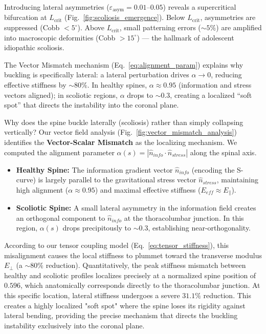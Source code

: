 \documentclass[11pt]{article}
\begin{document}
Introducing lateral asymmetries ($\varepsilon_{\mathrm{asym}} = 0.01$--$0.05$) reveals a supercritical bifurcation at $L_{\mathrm{crit}}$ (Fig.~\ref{fig:scoliosis_emergence}). Below $L_{\mathrm{crit}}$, asymmetries are suppressed (Cobb $< 5^\circ$). Above $L_{\mathrm{crit}}$, small patterning errors (${\sim}5\%$) are amplified into macroscopic deformities (Cobb $> 15^\circ$) --- the hallmark of adolescent idiopathic scoliosis.

The Vector Mismatch mechanism (Eq.~\ref{eq:alignment_param}) explains why buckling is specifically lateral: a lateral perturbation drives $\alpha \to 0$, reducing effective stiffness by ${\sim}80\%$. In healthy spines, $\alpha \approx 0.95$ (information and stress vectors aligned); in scoliotic regions, $\alpha$ drops to ${\sim}0.3$, creating a localized ``soft spot'' that directs the instability into the coronal plane.

Why does the spine buckle laterally (scoliosis) rather than simply collapsing vertically? Our vector field analysis (Fig.~\ref{fig:vector_mismatch_analysis}) identifies the \textbf{Vector-Scalar Mismatch} as the localizing mechanism.
We computed the alignment parameter $\alpha(s) = |\hat{n}_{info} \cdot \hat{n}_{stress}|$ along the spinal axis.
\begin{itemize}
    \item \textbf{Healthy Spine:} The information gradient vector $\hat{n}_{info}$ (encoding the S-curve) is largely parallel to the gravitational stress vector $\hat{n}_{stress}$, maintaining high alignment ($\alpha \approx 0.95$) and maximal effective stiffness ($E_{eff} \approx E_{\parallel}$).
    \item \textbf{Scoliotic Spine:} A small lateral asymmetry in the information field creates an orthogonal component to $\hat{n}_{info}$ at the thoracolumbar junction. In this region, $\alpha(s)$ drops precipitously to $\sim 0.3$, establishing near-orthogonality.
\end{itemize}
According to our tensor coupling model (Eq.~\ref{eq:tensor_stiffness}), this misalignment causes the local stiffness to plummet toward the transverse modulus $E_{\perp}$ (a $\sim 80\%$ reduction). Quantitatively, the peak stiffness mismatch between healthy and scoliotic profiles localizes precisely at a normalized spine position of $0.596$, which anatomically corresponds directly to the thoracolumbar junction. At this specific location, lateral stiffness undergoes a severe $31.1\%$ reduction. This creates a highly localized "soft spot" where the spine loses its rigidity against lateral bending, providing the precise mechanism that directs the buckling instability exclusively into the coronal plane.
\end{document}
